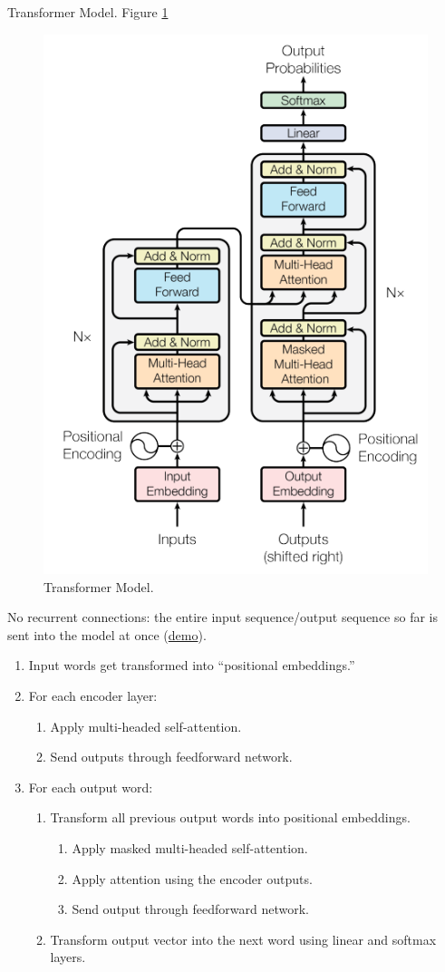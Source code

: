 \documentclass[english]{article}
\begin{document}
\item 
 {Transformer Model}.  Figure \ref{Transformer Model}

\begin{figure}
\centering
\includegraphics[width=0.45\linewidth]{transformer2.png}
    \caption{Transformer Model.}
    \label{Transformer Model}
\end{figure} 


No recurrent connections: the entire input sequence/output sequence so far is sent into the model at once (\href{https://ai.googleblog.com/2017/08/transformer-novel-neural-network.html}{demo}).
 
\begin{enumerate}
\item Input words get transformed into ``positional embeddings.''
\item For each encoder layer:
\begin{enumerate}
\item Apply multi-headed self-attention.
\item Send outputs through feedforward network.
\end{enumerate}
\item For each output word:
\begin{enumerate}
\item Transform all previous output words into positional embeddings.
\begin{enumerate}
\item Apply masked multi-headed self-attention.
\item Apply attention using the encoder outputs.
\item Send output through feedforward network.
\end{enumerate}
\item Transform output vector into the next word using linear and softmax layers.
\end{enumerate}
\end{enumerate}
 
\end{document}

